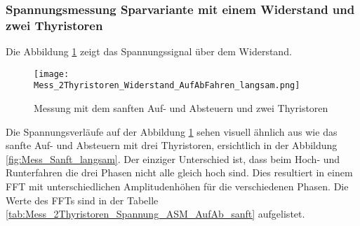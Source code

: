 \newpage
\subsubsection{Spannungsmessung Sparvariante mit einem Widerstand und zwei Thyristoren}

Die Abbildung \ref{fig:Mess_2Thyristoren_Widerstand_AufAbFahren_langsam} zeigt das Spannungssignal über dem Widerstand. 

\begin{figure}[ht!]
	\centering
	\texttt{[image: Mess\_2Thyristoren\_Widerstand\_AufAbFahren\_langsam.png]}	
	\caption{Messung mit dem sanften Auf- und Absteuern und zwei Thyristoren}\label{fig:Mess_2Thyristoren_Widerstand_AufAbFahren_langsam}	
\end{figure}

Die Spannungsverläufe auf der Abbildung \ref{fig:Mess_2Thyristoren_Widerstand_AufAbFahren_langsam} sehen visuell ähnlich aus wie das sanfte Auf- und Absteuern mit drei Thyristoren, ersichtlich in der Abbildung \ref{fig:Mess_Sanft_langsam}.  Der einziger Unterschied ist, dass beim Hoch- und Runterfahren die drei Phasen nicht alle gleich hoch sind. Dies resultiert in einem FFT mit unterschiedlichen Amplitudenhöhen für die verschiedenen Phasen. Die Werte des FFTs sind in der Tabelle \ref{tab:Mess_2Thyristoren_Spannung_ASM_AufAb_sanft} aufgelistet. \\\\

